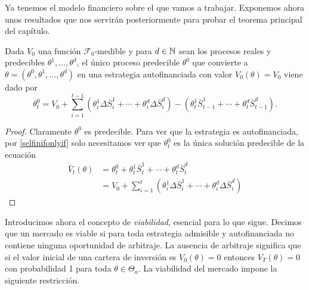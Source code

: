Ya tenemos el modelo financiero sobre el que vamos a trabajar. Exponemos ahora unos resultados que nos servirán posteriormente para probar el teorema principal del capítulo.
\bigskip
\begin{lemaBox}\label{2.2.1}
	Dada $ V_0 $ una función $ \mathcal{F}_0 $-medible y para $ d \in \mathbb{N}  $ sean los procesos reales y predecibles $ \theta^1,\dots,\theta^d $, el único proceso predecible $ \theta^0 $ que convierte a $ \theta = (\theta^0,\theta^1,\dots,\theta^d) $ en una estrategia autofinanciada con valor $ V_0 (\theta)= V_0 $ viene dado por
	\[
	\theta^0_t = V_0 + \sum_{i=1}^{t-1}(\theta^1_i\Delta\bar{S}^1_i+\cdots+\theta^d_i\Delta\bar{S}^d_i) - (\theta^1_t\bar{S}^1_{t-1}+\cdots+\theta^d_t\bar{S}^d_{t-1}).
	\]
\end{lemaBox}
\begin{proof}
	Claramente $ \theta^0 $ es predecible. Para ver que la estrategia es autofinanciada, por \eqref{selfinifonlyif} solo necesitamos ver que $ \theta^0_t $ es la única solución predecible de la ecuación 
	\begin{equation*}
	\begin{split}
	\bar{V}_t(\theta) &= \theta^0_t + \theta^1_t\bar{S}^1_t+\cdots+\theta^d_t\bar{S}^d_t \\
	&= V_0 + \sum_{i=1}^{t}(\theta^1_i\Delta\bar{S}^1_i+\cdots+\theta^d_i\Delta\bar{S}^d_i)
	\end{split}
	\end{equation*}
\end{proof}
\bigskip
Introducimos ahora el concepto de \textit{viabilidad}, esencial para lo que sigue. Decimos que un mercado es viable si para toda estrategia admisible y autofinanciada no contiene ninguna oportunidad de arbitraje. La ausencia de arbitraje significa que si el valor inicial de una cartera de inversión es $ V_0(\theta) = 0 $ entonces $ V_T(\theta) = 0 $ con probabilidad 1 para toda $ \theta \in\Theta_a $. La viabilidad del mercado impone la siguiente restricción.

